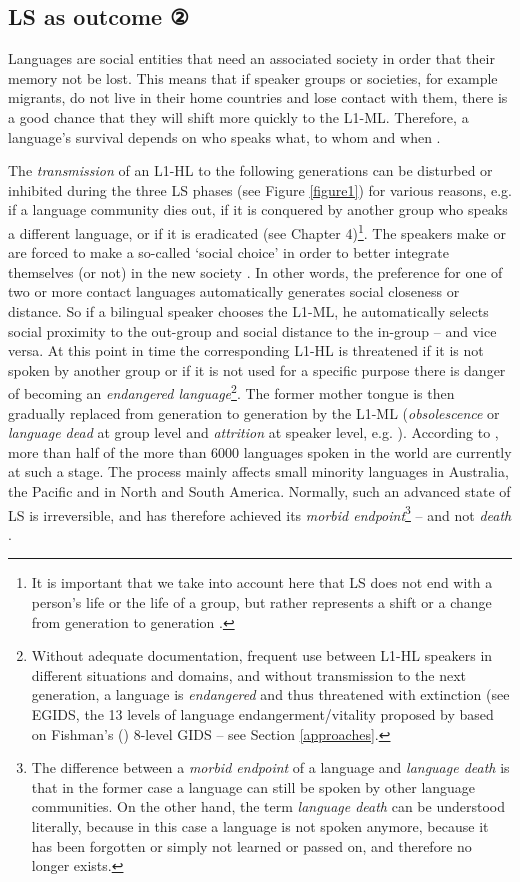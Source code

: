 \documentclass[output=paper,
modfonts
]{langscibook}
\begin{document}
\subsection*{LS as outcome ②}

Languages are social entities that need an associated society in order that their memory not be lost. This means that if speaker groups or societies, for example migrants, do not live in their home countries and lose contact with them, there is a good chance that they will shift more quickly to the L1-ML. Therefore, a language's survival depends on who speaks what, to whom and when \parencite{Fishman1964}.

The \emph{transmission} of an L1-HL to the following generations can be disturbed or inhibited during the three LS phases (see Figure \ref{figure1}) for various reasons, e.g. if a language community dies out, if it is conquered by another group who speaks a different language, or if it is eradicated (see Chapter 4)\footnote{It is important that we take into account here that LS does not end with a person's life or the life of a group, but rather represents a shift or a change from generation to generation \parencite[195]{Jagodic2011}.}. The speakers make or are forced to make a so-called ‘social choice' in order to better integrate themselves (or not) in the new society \parencite[325]{Ostler2011}. In other words, the preference for one of two or more contact languages automatically generates social closeness or distance. So if a bilingual speaker chooses the L1-ML, he automatically selects social proximity to the out-group and social distance to the in-group -- and vice versa. At this point in time the corresponding L1-HL is threatened if it is not spoken by another group or if it is not used for a specific purpose there is danger of becoming an \emph{endangered language}\footnote{Without adequate documentation, frequent use between L1-HL speakers in different situations and domains, and without transmission to the next generation, a language is \emph{endangered} and thus threatened with extinction (see EGIDS, the 13 levels of language endangerment/vitality proposed by \cite[2]{Brenzinger2003} based on Fishman's (\citeyear{Fishman1991}) 8-level GIDS -- see Section \ref{approaches}.}. The former mother tongue is then gradually replaced from generation to generation by the L1-ML (\emph{obsolescence} or \emph{language dead} at group level and \emph{attrition} at speaker level, e.g. \citealt{Crystal2000}).
According to \cite[7]{Nettle2000}, more than half of the more than 6000 languages spoken in the world are currently at such a stage. The process mainly affects small minority languages in Australia, the Pacific and in North and South America. Normally, such an advanced state of LS is irreversible, and has therefore achieved its \emph{morbid endpoint}\footnote{The difference between a \emph{morbid endpoint} of a language and \emph{language death} is that in the former case a language can still be spoken by other language communities.  On the other hand, the term \emph{language death} can be understood literally, because in this case a language is not spoken anymore, because it has been forgotten or simply not learned or passed on, and therefore no longer exists.} -- and not \emph{death} \parencite[18]{Pauwels2016}.
\end{document}
